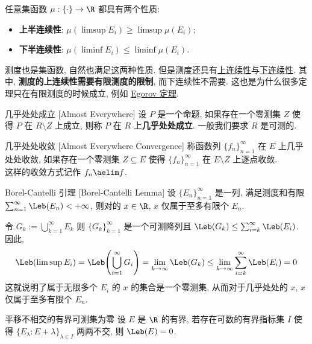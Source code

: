 \begin{rmk}
    任意集函数 \(\mu:\{\cdot\}\to\R\) 都具有两个性质:
    \begin{itemize}
        \item \textbf{上半连续性}: \(\mu(\limsup E_i)\geq \limsup \mu(E_i)\);
        \item \textbf{下半连续性}: \(\mu(\liminf E_i)\leq \liminf \mu(E_i)\).
    \end{itemize}
    测度也是集函数, 自然也满足这两种性质. 但是测度还具有\hyperref[ppt:measure-continuity-above]{上连续性}与\hyperref[ppt:measure-continuity-below]{下连续性}. 
    \tcbline
    其中, \textbf{测度的上连续性需要有限测度的限制}, 而下连续性不需要. 这也是为什么很多定理只在有限测度的时候成立, 例如 \hyperref[thm:egorov]{Egorov 定理}.
\end{rmk}
\begin{dfn}
    [ae]
    {几乎处处成立}
    [Almost Everywhere]
    设 \(P\) 是一个命题, 如果存在一个零测集 \(Z\) 使得 \(P\) 在 \(R\setminus Z\) 上成立, 则称 \(P\) 在 \(R\) 上\textbf{几乎处处成立}. 一般我们要求 \(R\) 是可测的.
\end{dfn}
\begin{xmp}
    [ae-convergence]
    {几乎处处收敛}
    [Almost Everywhere Convergence]
    称函数列 \(\{f_n\}_{n=1}^\infty\) 在 \(E\) 上几乎处处收敛, 如果存在一个零测集 \(Z\subseteq E\) 使得 \(\{f_n\}_{n=1}^\infty\) 在 \(E\setminus Z\) 上逐点收敛.\\
    这样的收敛方式记作 \(f_n\aelim f\).
\end{xmp}
\begin{thm}
    {Borel-Cantelli 引理}
    [Borel-Cantelli Lemma]
    设 \(\{E_n\}_{n=1}^\infty\) 是一列\MeasurableSet{}, 满足测度和有限 \(\sum_{n=1}^\infty \Leb(E_n)<+\infty\), 则对\AlmostEverywhere{}的 \(x\in\R\), \(x\) 仅属于至多有限个 \(E_n\).
\end{thm}
\begin{prf}
    令 \(G_k:=\bigcup_{k=1}^{\infty}E_k\) 则 \(\{G_k\}_{k=1}^\infty\) 是一个可测降列且 \(\Leb(G_k)\leq \sum_{i=k}^\infty \Leb(E_i)\). 因此, 
    \[\Leb(\limsup E_i) = \Leb\qty(\bigcup_{i=1}^{\infty}G_i)=\lim_{k\to\infty} \Leb(G_k)\leq \lim_{k\to\infty} \sum_{i=k}^\infty \Leb(E_i)=0\]
    这就说明了属于无限多个 \(E_i\) 的 \(x\) 的集合是一个零测集, 从而对于几乎处处的 \(x\), \(x\) 仅属于至多有限个 \(E_n\).
\end{prf}
\begin{thm}
    {平移不相交的有界可测集为零}
    设 \(E\) 是 \(\R\) 的有界\MeasurableSet{}, 若存在可数的有界指标集 \(I\) 使得 \(\{E_\lambda:E+\lambda\}_{\lambda\in I}\) 两两不交, 则 \(\Leb(E)=0\).
\end{thm}

